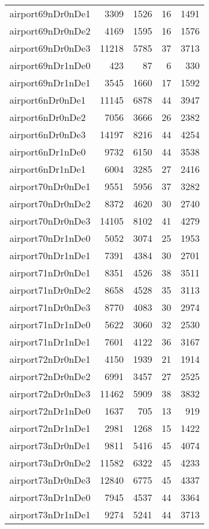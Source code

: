 \begin{longtable}{lrrrr}
airport69nDr0nDe1 & 3309 & 1526 & 16 & 1491 \\
airport69nDr0nDe2 & 4169 & 1595 & 16 & 1576 \\
airport69nDr0nDe3 & 11218 & 5785 & 37 & 3713 \\
airport69nDr1nDe0 & 423 & 87 & 6 & 330 \\
airport69nDr1nDe1 & 3545 & 1660 & 17 & 1592 \\
airport6nDr0nDe1 & 11145 & 6878 & 44 & 3947 \\
airport6nDr0nDe2 & 7056 & 3666 & 26 & 2382 \\
airport6nDr0nDe3 & 14197 & 8216 & 44 & 4254 \\
airport6nDr1nDe0 & 9732 & 6150 & 44 & 3538 \\
airport6nDr1nDe1 & 6004 & 3285 & 27 & 2416 \\
airport70nDr0nDe1 & 9551 & 5956 & 37 & 3282 \\
airport70nDr0nDe2 & 8372 & 4620 & 30 & 2740 \\
airport70nDr0nDe3 & 14105 & 8102 & 41 & 4279 \\
airport70nDr1nDe0 & 5052 & 3074 & 25 & 1953 \\
airport70nDr1nDe1 & 7391 & 4384 & 30 & 2701 \\
airport71nDr0nDe1 & 8351 & 4526 & 38 & 3511 \\
airport71nDr0nDe2 & 8658 & 4528 & 35 & 3113 \\
airport71nDr0nDe3 & 8770 & 4083 & 30 & 2974 \\
airport71nDr1nDe0 & 5622 & 3060 & 32 & 2530 \\
airport71nDr1nDe1 & 7601 & 4122 & 36 & 3167 \\
airport72nDr0nDe1 & 4150 & 1939 & 21 & 1914 \\
airport72nDr0nDe2 & 6991 & 3457 & 27 & 2525 \\
airport72nDr0nDe3 & 11462 & 5909 & 38 & 3832 \\
airport72nDr1nDe0 & 1637 & 705 & 13 & 919 \\
airport72nDr1nDe1 & 2981 & 1268 & 15 & 1422 \\
airport73nDr0nDe1 & 9811 & 5416 & 45 & 4074 \\
airport73nDr0nDe2 & 11582 & 6322 & 45 & 4233 \\
airport73nDr0nDe3 & 12840 & 6775 & 45 & 4337 \\
airport73nDr1nDe0 & 7945 & 4537 & 44 & 3364 \\
airport73nDr1nDe1 & 9274 & 5241 & 44 & 3713 \\

\end{longtable}
